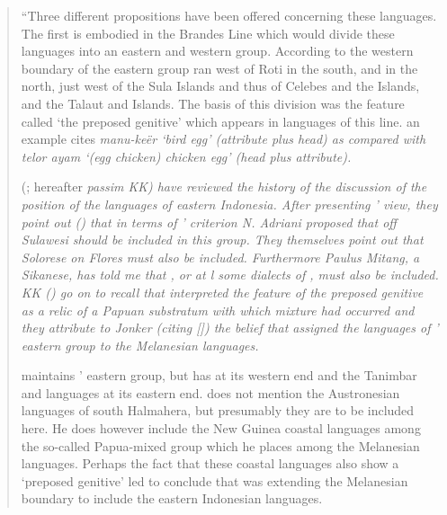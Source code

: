 \begin{quote}
	``Three different propositions have been offered concerning these languages.
	The first is embodied in the Brandes Line which would divide these languages
	into an eastern and western group.
	According to \citeauthor{Brandes1884} the western boundary
	of the eastern group ran west of Roti in the south,
	and in the north, just west of the Sula Islands
	and thus  of Celebes and the  Islands,
	and the Talaut and  Islands.
	The basis of this division was the feature called ‘the preposed genitive’ which appears in languages  of this line.
	 an example \citeauthor{Brandes1884} cites  \it{manu-keër} \it{‘bird egg’}
	(attribute plus head) as compared with  \it{telor ayam}
	\it{‘(egg chicken) chicken egg’} (head plus attribute).

	\citeauthor{KanskiKasprusch1931} (\citeyear{KanskiKasprusch1931}; hereafter \it{passim} KK) have reviewed
	the history of the discussion of the position of the languages of eastern Indonesia.
	After presenting \citeauthor{Brandes1884}’ view,
	they point out (\citeyear[883]{KanskiKasprusch1931})
	that in terms of \citeauthor{Brandes1884}’ criterion N.
	Adriani proposed that  off Sulawesi should be included in this group.
	They themselves point out that Solorese on Flores must also be included.
	Furthermore Paulus Mitang, a Sikanese, has told me that ,
	or at l some dialects of , must also be included.
	KK (\citeyear[884]{KanskiKasprusch1931}) go on to recall that \citeauthor{Schmidt1926}
	interpreted the feature of the preposed
	genitive as a relic of a Papuan substratum with which mixture had occurred
	and they attribute to Jonker (citing \citeauthor{Jonker1914} [\citeyear[4]{Jonker1914}])
	the belief that \citeauthor{Schmidt1926}
	assigned the languages of \citeauthor{Brandes1884}’ eastern group to the Melanesian languages.

	\citet{Schmidt1926} maintains \citeauthor{Brandes1884}’ eastern group,
	but has  at its western end and the Tanimbar
	and  languages at its eastern end.
	\citeauthor{Schmidt1926} does not mention the Austronesian languages of south Halmahera,
	but presumably they are to be included here.
	He does however include the New Guinea coastal languages among
	the so-called Papua-mixed group which he places among the Melanesian languages.
	Perhaps the fact that these coastal languages also show a
	‘preposed genitive’ led \citeauthor{Jonker1914} to conclude that \citeauthor{Schmidt1926}
	was extending the Melanesian boundary to include the eastern Indonesian languages.


\end{quote}
